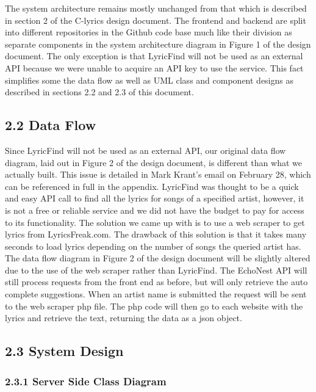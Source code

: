 \documentclass[]{article}
\begin{document}
The system architecture remains mostly unchanged from that which is
described in section 2 of the C-lyrics design document. The frontend and
backend are split into different repositories in the Github code base
much like their division as separate components in the system
architecture diagram in Figure 1 of the design document. The only
exception is that LyricFind will not be used as an external API because
we were unable to acquire an API key to use the service. This fact
simplifies some the data flow as well as UML class and component designs
as described in sections 2.2 and 2.3 of this document.

\subsection{2.2 Data Flow}\label{data-flow}

Since LyricFind will not be used as an external API, our original data
flow diagram, laid out in Figure 2 of the design document, is different
than what we actually built. This issue is detailed in Mark Krant's
email on February 28, which can be referenced in full in the appendix.
LyricFind was thought to be a quick and easy API call to find all the
lyrics for songs of a specified artist, however, it is not a free or
reliable service and we did not have the budget to pay for access to its
functionality. The solution we came up with is to use a web scraper to
get lyrics from LyricsFreak.com. The drawback of this solution is that
it takes many seconds to load lyrics depending on the number of songs
the queried artist has. The data flow diagram in Figure 2 of the design
document will be slightly altered due to the use of the web scraper
rather than LyricFind. The EchoNest API will still process requests from
the front end as before, but will only retrieve the auto complete
suggestions. When an artist name is submitted the request will be sent
to the web scraper php file. The php code will then go to each website
with the lyrics and retrieve the text, returning the data as a json
object.

\subsection{2.3 System Design}\label{system-design}

\subsubsection{2.3.1 Server Side Class
Diagram}\label{server-side-class-diagram}
\end{document}
